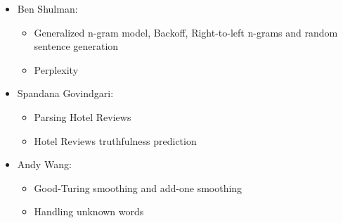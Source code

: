 \documentclass{article}
\begin{document}
\begin{itemize}[noitemsep]
\item Ben Shulman:
  \begin{itemize}[noitemsep,nolistsep]
  \item Generalized n-gram model, Backoff, Right-to-left n-grams and random sentence generation
  \item Perplexity
  \end{itemize}
\item Spandana Govindgari:
  \begin{itemize}[noitemsep,nolistsep]
  \item Parsing Hotel Reviews
  \item Hotel Reviews truthfulness prediction
  \end{itemize}
\item Andy Wang:
  \begin{itemize}[noitemsep,nolistsep]
  \item Good-Turing smoothing and add-one smoothing
  \item Handling unknown words
  \end{itemize}
\end{itemize}
\end{document}
